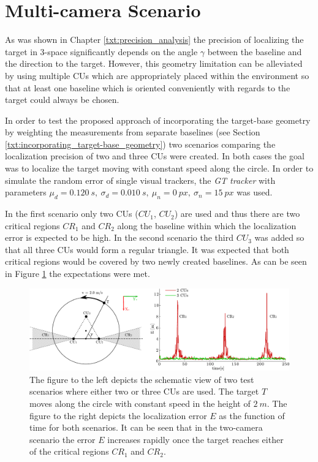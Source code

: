 \section{Multi-camera Scenario} \label{txt:multi-camera_scenario}

As was shown in Chapter \ref{txt:precision_analysis} the precision of localizing the target in 3-space significantly depends on the angle $\gamma$ between the baseline and the direction to the target. However, this geometry limitation can be alleviated by using multiple CUs which are appropriately placed within the environment so that at least one baseline which is oriented conveniently with regards to the target could always be chosen.

In order to test the proposed approach of incorporating the target-base geometry by weighting the measurements from separate baselines (see Section \ref{txt:incorporating_target-base_geometry}) two scenarios comparing the localization precision of two and three CUs were created. In both cases the goal was to localize the target moving with constant speed along the circle. In order to simulate the random error of single visual trackers, the \textit{GT tracker} with parameters $\mu_{d} = 0.120~s,~\sigma_{d} = 0.010~s,~\mu_{n} = 0~px,~\sigma_{n} = 15~px$ was used. 

In the first scenario only two CUs ($CU_{1}$, $CU_{2}$) are used and thus there are two critical regions $CR_{1}$ and $CR_{2}$ along the baseline within which the localization error is expected to be high. In the second scenario the third $CU_{3}$ was added so that all three CUs would form a regular triangle. It was expected that both critical regions would be covered by two newly created baselines. As can be seen in Figure \ref{fig:test_two_vs_three_cus} the expectations were met.

\begin{figure}[htb]\centering
	\centering
	\includegraphics[width=0.95\linewidth]{fig/schema_two_vs_three_units_and_plot.pdf}
	\caption{The figure to the left depicts the schematic view of two test scenarios where either two or three CUs are used. The target $T$ moves along the circle with constant speed in the height of $2~m$. The figure to the right depicts the localization error $E$ as the function of time for both scenarios. It can be seen that in the two-camera scenario the error $E$ increases rapidly once the target reaches either of the critical regions $CR_{1}$ and $CR_{2}$.}
	\label{fig:test_two_vs_three_cus}
\end{figure}
	
